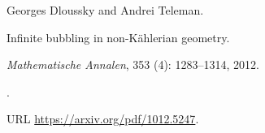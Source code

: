 Georges Dloussky and Andrei Teleman.

\newblock Infinite bubbling in non-{K}{\"a}hlerian geometry.

\newblock \emph{Mathematische Annalen}, 353 (4): 1283--1314,
  2012.

\newblock {}.

\newblock URL \url{https://arxiv.org/pdf/1012.5247}.
